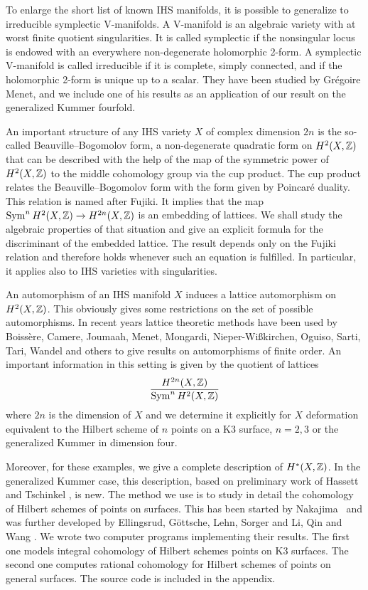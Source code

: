 To enlarge the short list of known IHS manifolds, it is possible to generalize to irreducible symplectic V-manifolds. A V-manifold is an algebraic variety with at worst finite quotient singularities. It is called symplectic if the nonsingular locus is endowed with an everywhere non-degenerate holomorphic 2-form. 
A symplectic V-manifold is called irreducible if it is complete, simply connected, and if the holomorphic 2-form is unique up to a scalar. They have been studied by Gr\'egoire Menet, and we include one of his results as an application of our result on the generalized Kummer fourfold.

An important structure of any IHS variety $X$ of complex dimension $2n$ is the so-called Beauville--Bogomolov form, a non-degenerate quadratic form on $H^2(X,\mathbb{Z})$ that can be described with the help of the map of the symmetric power of $H^2(X,\mathbb{Z})$ to the middle cohomology group via the cup product. The cup product relates the Beauville--Bogomolov form with the form given by Poincar\'e duality. This relation is named after Fujiki. It implies that the map $\operatorname{Sym}^n H^2(X,\mathbb{Z})\rightarrow H^{2n}(X,\mathbb{Z})$ is an embedding of lattices. We shall study the algebraic properties of that situation and give an explicit formula for the discriminant of the embedded lattice. The result depends only on the Fujiki relation and therefore holds whenever such an equation is fulfilled. In particular, it applies also to IHS varieties with singularities.

An automorphism of an IHS manifold $X$ induces a lattice automorphism on $H^2(X,\mathbb{Z})$. This obviously gives some restrictions on the set of possible automorphisms.
In recent years lattice theoretic methods have been used by
Boiss\`ere, Camere, Joumaah, Menet, Mongardi, Nieper-Wi\ss kirchen, Oguiso, Sarti, Tari, Wandel and others to give results on
automorphisms of finite order. 
An important information in this setting is given by the quotient of lattices
$$
\frac{H^{2n}(X,\mathbb{Z})}{\operatorname{Sym}^n H^2(X,\mathbb{Z})}
$$
where $2n$ is the dimension of $X$ and we determine it explicitly for $X$ deformation equivalent to the Hilbert scheme of $n$ points on a K3 surface, $n=2,3$ or the generalized Kummer in dimension four. 

Moreover, for these examples, we give a complete description of $H^*(X,\mathbb{Z})$. In the generalized Kummer case, this description, based on preliminary work of Hassett and Tschinkel \cite{Hassett}, is new. 
The method we use is to study in detail the cohomology of Hilbert schemes of points on surfaces. This has been started by Nakajima~\cite{Nakajima} and was further developed by Ellingsrud, G\"ottsche, Lehn, Sorger \cite{EGL,LehnSorger} and Li, Qin and Wang \cite{LiQinWang,LiQinWang2,QinWang}.
We wrote two computer programs implementing their results. The first one models integral cohomology of Hilbert schemes points on K3 surfaces. The second one computes rational cohomology for Hilbert schemes of points on general surfaces. The source code is included in the appendix. 

